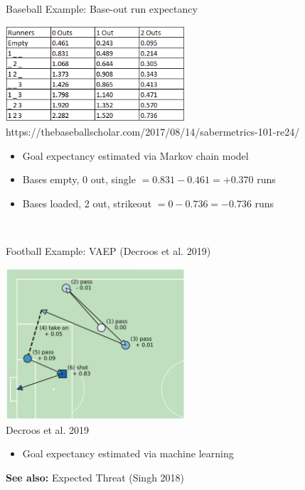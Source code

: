 \documentclass[handout]{beamer}
\begin{document}
\begin{frame}{Baseball Example: Base-out run expectancy}
  \begin{center}
    \includegraphics[width = 0.5\textwidth]{images/base_out_run_expectancy.png}
    \scriptsize\color{gray} https://thebaseballscholar.com/2017/08/14/sabermetrics-101-re24/
  \end{center}
  \begin{itemize}
    \item Goal expectancy estimated via Markov chain model
    \item Bases empty, 0 out, single $= 0.831 - 0.461 = +0.370$ runs
    \item Bases loaded, 2 out, strikeout $= 0 - 0.736 = -0.736$ runs
  \end{itemize}
  ~\\
\end{frame}


\begin{frame}{Football Example: VAEP (Decroos et al. 2019)}
  \begin{center}
    \includegraphics[width = 0.5\textwidth]{images/vaep.png}\\
    {\scriptsize\color{gray} Decroos et al. 2019}
    \begin{itemize}
      \item Goal expectancy estimated via machine learning
    \end{itemize}
  \end{center}
  {\bf See also:} Expected Threat (Singh 2018)
\end{frame}
\end{document}
